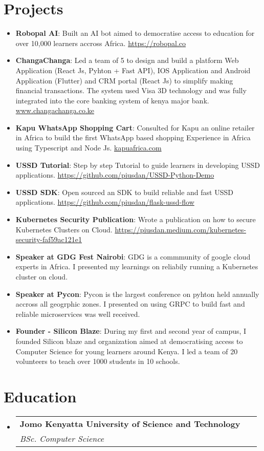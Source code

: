 \documentclass[letterpaper,11pt]{article}
\makeatletter
\newcommand{\resumeItem}[2]{
  \item\small{
    \textbf{#1}{: #2 \vspace{-2pt}}
  }
}
\newcommand{\resumeSubheading}[4]{
  \vspace{-1pt}\item
    \begin{tabular*}{0.97\textwidth}{l@{\extracolsep{\fill}}r}
      \textbf{#1} & #2 \\
      \textit{\small#3} & \textit{\small #4} \\
    \end{tabular*}\vspace{-5pt}
}
\newcommand{\resumeSubItem}[2]{\resumeItem{#1}{#2}\vspace{-4pt}}
\newcommand{\resumeSubHeadingListStart}{\begin{itemize}[leftmargin=*]}
\newcommand{\resumeSubHeadingListEnd}{\end{itemize}}
\makeatother
\begin{document}
\section{Projects}
  \resumeSubHeadingListStart  	
	  \resumeSubItem {Robopal AI}
	  {Built an AI bot aimed to democratise access to education for over 10,000 learners accross Africa. \href{https://robopal.co}{https://robopal.co}}
	\resumeSubItem {ChangaChanga}
	{Led a team of 5 to design and build a platform Web Application (React Js, Pyhton + Fast API), IOS Application and Android Application (Flutter) and CRM portal (React Js) to simplify making financial transactions. The system used Visa 3D technology and was fully integrated into the core banking system of kenya major bank. \href{https://changachanga.co.ke}{www.changachanga.co.ke}}
\resumeSubItem{Kapu WhatsApp Shopping Cart}
{Consulted for Kapu an online retailer in Africa to build the first WhatsApp based shopping Experience in Africa using Typescript and Node Js. \href{https://kapuafrica.com}{kapuafrica.com}}
    \resumeSubItem{USSD Tutorial}
      {Step by step Tutorial to guide learners in developing USSD applications. \href{https://github.com/piusdan/USSD-Python-Demo}{https://github.com/piusdan/USSD-Python-Demo}}
    \resumeSubItem{USSD SDK}
      {Open sourced an SDK to build reliable and fast USSD applications. \href{https://github.com/piusdan/flask-ussd-flow}{https://github.com/piusdan/flask-ussd-flow}}
    \resumeSubItem{Kubernetes Security Publication}
      {Wrote a publication on how to secure Kubernetes Clusters on Cloud. \href{https://piusdan.medium.com/kubernetes-security-faf59ac121e1}{https://piusdan.medium.com/kubernetes-security-faf59ac121e1}}
  	\resumeSubItem{Speaker at GDG Fest Nairobi}
      {GDG is a commmunity of google cloud experts in Africa. I presented my learnings on reliabily running a Kubernetes cluster on cloud.}
  	\resumeSubItem{Speaker at Pycon}
      {Pycon is the largest conference on pyhton held annually accross all geogrphic zones. I presented on using GRPC to build fast and reliable microservices was well received.}
    \resumeSubItem{Founder - Silicon Blaze}
      {During my first and second year of campus, I founded Silicon blaze and organization aimed at democratising access to Computer Science for young learners around Kenya. I led a team of 20 volunteers to teach over 1000 students in 10 schools.}
  \resumeSubHeadingListEnd

\section{Education}
  \resumeSubHeadingListStart
    \resumeSubheading
      {Jomo Kenyatta University of Science and Technology}{}
      {BSc. Computer Science}\
  \resumeSubHeadingListEnd

\end{document}
